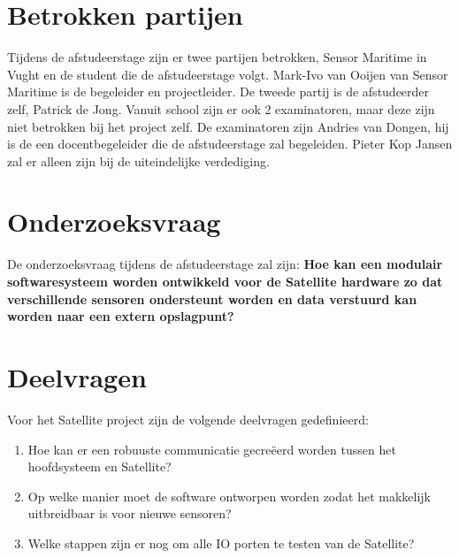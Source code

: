 \section{Betrokken partijen}
Tijdens de afstudeerstage zijn er twee partijen betrokken, Sensor Maritime in Vught en de student die de afstudeerstage volgt. Mark-Ivo van Ooijen van Sensor Maritime is de begeleider en projectleider. De tweede partij is de afstudeerder zelf, Patrick de Jong. Vanuit school zijn er ook 2 examinatoren, maar deze zijn niet betrokken bij het project zelf. De examinatoren zijn Andries van Dongen, hij is de een docentbegeleider die de afstudeerstage zal begeleiden. Pieter Kop Jansen zal er alleen zijn bij de uiteindelijke verdediging.

\section{Onderzoeksvraag}
De onderzoeksvraag tijdens de afstudeerstage zal zijn: \textbf{Hoe kan een modulair softwaresysteem worden ontwikkeld voor de Satellite hardware zo dat verschillende sensoren ondersteunt worden en data verstuurd kan worden naar een extern opslagpunt?}
\newpage
\section{Deelvragen}
Voor het Satellite project zijn de volgende deelvragen gedefinieerd:
\begin{enumerate}
	\item Hoe kan er een robuuste  communicatie gecreëerd worden tussen het hoofdsysteem en Satellite?
	\item Op welke manier moet de software ontworpen worden zodat het makkelijk uitbreidbaar is voor nieuwe sensoren?
	\item Welke stappen zijn er nog om alle IO porten te testen van de Satellite?
\end{enumerate}

